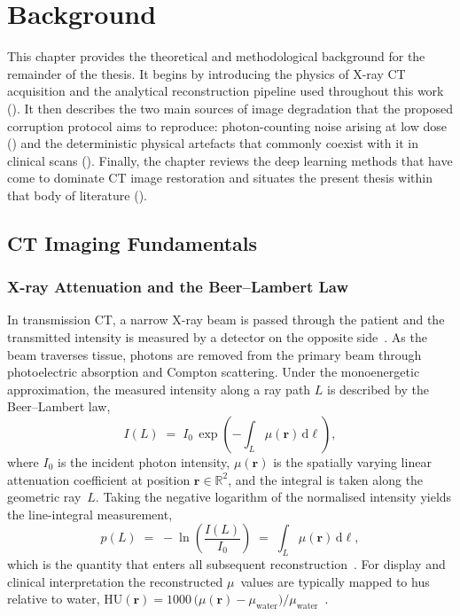 \chapter{Background}
\label{chap:background}

This chapter provides the theoretical and methodological background for the remainder of the thesis. It begins by introducing the physics of X-ray CT acquisition and the analytical reconstruction pipeline used throughout this work (). It then describes the two main sources of image degradation that the proposed corruption protocol aims to reproduce: photon-counting noise arising at low dose () and the deterministic physical artefacts that commonly coexist with it in clinical scans (). Finally, the chapter reviews the deep learning methods that have come to dominate CT image restoration and situates the present thesis within that body of literature ().

\section{CT Imaging Fundamentals}
\label{sec:bg_ct_fundamentals}

\subsection{X-ray Attenuation and the Beer--Lambert Law}
\label{subsec:bg_beer_lambert}

In transmission CT, a narrow X-ray beam is passed through the patient and the transmitted intensity is measured by a detector on the opposite side~\cite{Hounsfield1973, KakSlaney1988}. As the beam traverses tissue, photons are removed from the primary beam through photoelectric absorption and Compton scattering. Under the monoenergetic approximation, the measured intensity along a ray path $L$ is described by the Beer--Lambert law,
\begin{equation}
    I(L) \;=\; I_{0}\,\exp\!\left(-\int_{L} \mu(\boldsymbol{r})\,\mathrm{d}\ell\right),
    \label{eq:beer_lambert}
\end{equation}
where $I_0$ is the incident photon intensity, $\mu(\boldsymbol{r})$ is the spatially varying linear attenuation coefficient at position $\boldsymbol{r} \in \mathbb{R}^{2}$,
and the integral is taken along the geometric ray~$L$. Taking the negative logarithm of the normalised intensity yields the line-integral measurement,
\begin{equation}
    p(L) \;=\; -\ln\!\left(\frac{I(L)}{I_{0}}\right) \;=\; \int_{L} \mu(\boldsymbol{r})\,\mathrm{d}\ell,
    \label{eq:line_integral}
\end{equation}
which is the quantity that enters all subsequent reconstruction~\cite{KakSlaney1988, Buzug2008}. For display and clinical interpretation the reconstructed $\mu$~values are typically
mapped to \glspl{hu} relative to water, $\mathrm{HU}(\boldsymbol{r}) = 1000\,\bigl(\mu(\boldsymbol{r}) - \mu_{\text{water}}\bigr)/\mu_{\text{water}}$~\cite{Hounsfield1973}.

